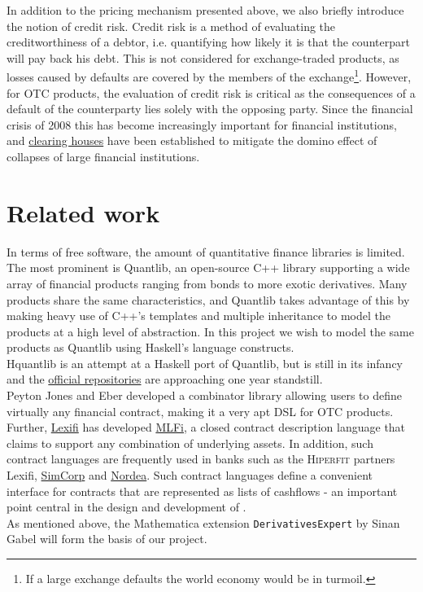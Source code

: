 In addition to the pricing mechanism presented above, we also briefly introduce
the notion of credit risk. Credit risk is a method of evaluating the creditworthiness
of a debtor, i.e. quantifying how likely it is that the counterpart will pay back 
his debt. This is not considered for exchange-traded products, as losses 
caused by defaults are covered by the members of the exchange\footnote{If a large 
exchange defaults the world economy would be in turmoil.}. However, for OTC
products, the evaluation of credit risk is critical as the consequences of a 
default of the counterparty lies solely with the opposing party. Since the 
financial crisis of 2008 this has become increasingly important for financial 
institutions, and \href{http://www.lchclearnet.com/}{clearing houses} have
been established to mitigate the 
domino effect of collapses of large financial institutions.

\section{Related work}

In terms of free software, the amount of quantitative finance libraries is 
limited.
The most prominent is Quantlib, an open-source C++ library\cite{Ame2003}
supporting a wide array of financial products ranging from bonds to more 
exotic derivatives. Many products share the same characteristics, and
Quantlib takes advantage of this by making heavy use of C++'s templates 
and multiple  inheritance to model the products at a high level of 
abstraction\cite{implql}.
In this project we wish to model the same products as Quantlib using Haskell's
language constructs.\\

Hquantlib\cite{hquantlib} is an attempt at a Haskell port of Quantlib,
but is still in its infancy and the
\href{https://github.com/paulrzcz/hquantlib/tree/master}{official repositories}
are approaching one year standstill.\\

Peyton Jones and Eber\cite{composingcontracts} developed a combinator library 
allowing users to define virtually any financial contract, making it a very
apt DSL for OTC products. Further, \href{http://www.lexifi.com/}{Lexifi} has developed 
\href{http://www.lexifi.com/product/technology/contract-description-language}{MLFi},
a closed contract description language that claims to support any combination of
underlying assets. In addition, such contract languages are frequently used in
banks such as the \textsc{Hiperfit} partners Lexifi, \href{www.simcorp.com}{SimCorp}
and \href{www.nordea.com}{Nordea}. Such contract languages define a convenient
interface for contracts that are represented as lists of cashflows - an
important point central in the design and development of \hql.\\

As mentioned above, the Mathematica extension
\texttt{DerivativesExpert}\cite{Mathematica:DerivativesExpert} by Sinan Gabel
will form the basis of our project.

